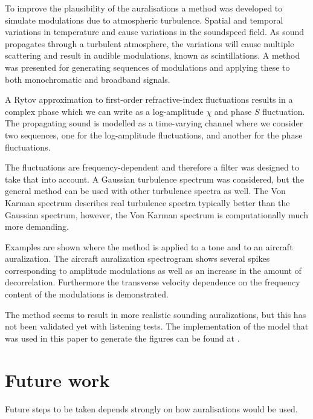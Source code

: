 To improve the plausibility of the auralisations
a method was developed to simulate modulations due to atmospheric turbulence.
Spatial and temporal variations in temperature and cause variations in the soundspeed field.
As sound propagates through a turbulent atmosphere, the variations will cause
multiple scattering and result in audible modulations, known as scintillations.
A method was presented for generating sequences of modulations and applying
these to both monochromatic and broadband signals.


A Rytov approximation to first-order refractive-index fluctuations results in a complex
phase which we can write as a log-amplitude $\chi$ and phase $S$ fluctuation.
The propagating sound is modelled as a time-varying channel where we consider
two sequences, one for the log-amplitude fluctuations, and another for the phase
fluctuations.

The fluctuations are frequency-dependent and therefore a filter was designed to take that into account.
A Gaussian turbulence spectrum was considered, but the general method can be
used with other turbulence spectra as well. The Von Karman spectrum describes
real turbulence spectra typically better than the Gaussian spectrum, however,
the Von Karman spectrum is computationally much more demanding.

Examples are shown where the method is applied to a tone and to an aircraft
auralization. The aircraft auralization spectrogram shows several spikes
corresponding to amplitude modulations as well as an increase in the amount of
decorrelation. Furthermore the transverse velocity dependence on the frequency
content of the modulations is demonstrated.

The method seems to result in more realistic sounding
auralizations, but this has not been validated yet with listening tests. The
implementation of the model that was used in this paper to generate the figures
can be found at \cite{Rietdijk2016}.

\section{Future work}
Future steps to be taken depends strongly on how auralisations would
be used.

